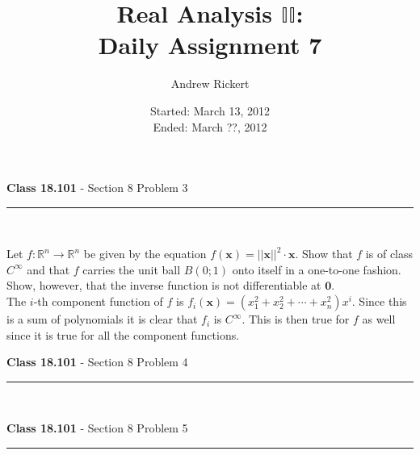 \documentclass[11pt,reqno]{article}
\title{Real Analysis $\mathbb{II}$: \\ Daily Assignment 7}
\author{Andrew Rickert}
\date{Started: March 13, 2012 \\ \hspace{1pt} Ended: March ??,  2012}                                           %
\begin{document}
\maketitle

\begin{flushleft} 
\textbf{Class 18.101} - Section 8 Problem 3\\
\rule{500pt}{1pt}\\
\end{flushleft} 

Let $f : \mathbb{R}^n \to \mathbb{R}^n$ be given by the equation $f(\textbf{x}) = ||\textbf{x}||^2 \cdot \textbf{x}$. Show that $f$ is of class $C^\infty$ and that $f$ carries the unit ball $B(0;1)$ onto itself in a one-to-one fashion. Show, however, that the inverse function is not differentiable at $\textbf{0}$.\\

The $i$-th component function of $f$ is $f_i(\textbf{x}) = (x_1^2 + x_2^2 + \cdots + x_n^2) x^i$. Since this is a sum of polynomials it is clear that $f_i$ is $C^\infty$. This is then true for $f$ as well since it is true for all the component functions.\\



\begin{flushleft} 
\textbf{Class 18.101} - Section 8 Problem 4\\
\rule{500pt}{1pt}\\
\end{flushleft} 



\begin{flushleft} 
\textbf{Class 18.101} - Section 8 Problem 5\\
\rule{500pt}{1pt}\\
\end{flushleft} 
\end{document}
